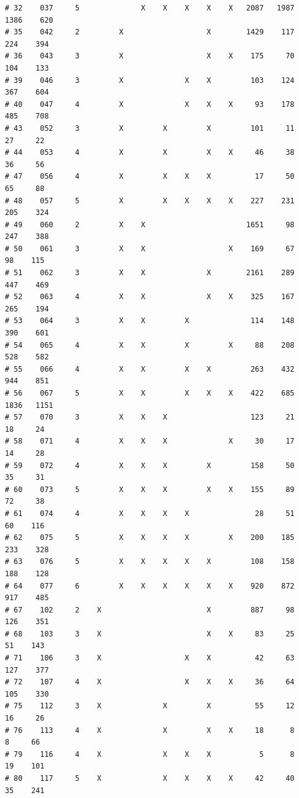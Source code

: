 \documentclass{article}\usepackage[]{graphicx}\usepackage[]{color}
\makeatletter
\newenvironment{kframe}{%
 \def\at@end@of@kframe{}%
 \ifinner\ifhmode%
  \def\at@end@of@kframe{\end{minipage}}%
  \begin{minipage}{\columnwidth}%
 \fi\fi%
 \def\FrameCommand##1{\hskip\@totalleftmargin \hskip-\fboxsep
 \colorbox{shadecolor}{##1}\hskip-\fboxsep
     \hskip-\linewidth \hskip-\@totalleftmargin \hskip\columnwidth}%
 \MakeFramed {\advance\hsize-\width
   \@totalleftmargin\z@ \linewidth\hsize
   \@setminipage}}%
 {\par\unskip\endMakeFramed%
 \at@end@of@kframe}
\newenvironment{knitrout}{}{} %
\makeatother
\begin{document}
\begin{knitrout}
\begin{kframe}
\begin{verbatim}
# 32    037     5              X    X    X    X    X   2087   1987   1386    620
# 35    042     2         X                   X        1429    117    224    394
# 36    043     3         X                   X    X    175     70    104    133
# 39    046     3         X              X    X         103    124    367    604
# 40    047     4         X              X    X    X     93    178    485    708
# 43    052     3         X         X         X         101     11     27     22
# 44    053     4         X         X         X    X     46     38     36     56
# 47    056     4         X         X    X    X          17     50     65     88
# 48    057     5         X         X    X    X    X    227    231    205    324
# 49    060     2         X    X                       1651     98    247    388
# 50    061     3         X    X                   X    169     67     98    115
# 51    062     3         X    X              X        2161    289    447    469
# 52    063     4         X    X              X    X    325    167    265    194
# 53    064     3         X    X         X              114    148    390    601
# 54    065     4         X    X         X         X     88    208    528    582
# 55    066     4         X    X         X    X         263    432    944    851
# 56    067     5         X    X         X    X    X    422    685   1836   1151
# 57    070     3         X    X    X                   123     21     18     24
# 58    071     4         X    X    X              X     30     17     14     28
# 59    072     4         X    X    X         X         158     50     35     31
# 60    073     5         X    X    X         X    X    155     89     72     38
# 61    074     4         X    X    X    X               28     51     60    116
# 62    075     5         X    X    X    X         X    200    185    233    328
# 63    076     5         X    X    X    X    X         108    158    188    128
# 64    077     6         X    X    X    X    X    X    920    872    917    485
# 67    102     2    X                        X         887     98    126    351
# 68    103     3    X                        X    X     83     25     51    143
# 71    106     3    X                   X    X          42     63    127    377
# 72    107     4    X                   X    X    X     36     64    105    330
# 75    112     3    X              X         X          55     12     16     26
# 76    113     4    X              X         X    X     18      8      8     66
# 79    116     4    X              X    X    X           5      8     19    101
# 80    117     5    X              X    X    X    X     42     40     35    241

\end{verbatim}
\end{kframe}
\end{knitrout}
\end{document}
